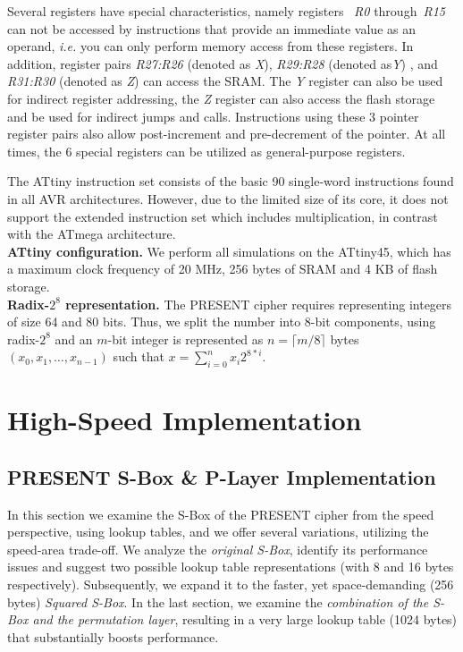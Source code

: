 \documentclass[11pt]{llncs2e} %
\begin{document}
Several registers have special characteristics, namely registers ~\textit{R0} through~\textit{R15} can not be accessed by instructions that provide an immediate value as an operand, \emph{i.e.} you can only perform memory access from these registers.
In addition, register pairs \textit{R27:R26} (denoted as \emph{X}), \textit{R29:R28} (denoted as\emph{Y}) , and \textit{R31:R30} (denoted as \emph{Z}) can access the SRAM.
The \emph{Y} register can also be used for indirect register addressing, the \emph{Z} register can also access the flash storage and be used for indirect jumps and calls.
Instructions using these 3 pointer register pairs also allow post-increment and pre-decrement of the pointer.
At all times, the 6 special registers can be utilized as general-purpose registers.

The ATtiny instruction set consists of the basic 90 single-word instructions found in all AVR architectures. However, due to the limited size of its core, it does not support the extended instruction set which includes multiplication, in contrast with the ATmega architecture.\\
\textbf{ATtiny configuration.} We perform all simulations on the ATtiny45, which has a maximum clock frequency of 20 MHz, 256 bytes of SRAM and 4 KB of flash storage.\\
\textbf{Radix-$2^8$ representation.} The PRESENT cipher requires representing integers of size 64 and 80 bits. Thus, we split the number into 8-bit components, using radix-$2^8$ and an $m$-bit integer is represented as $n=\lceil{m/8}\rceil$ bytes $(x_0,x_1,\dots,x_{n-1})$ such that $x=\sum_{i=0}^n{x_i 2^{8*i}}$.

\section{High-Speed Implementation}

\subsection{PRESENT S-Box \& P-Layer Implementation}\label{sbox}
In this section we examine the S-Box of the PRESENT cipher from the speed perspective, using lookup tables, and we offer several variations, utilizing the speed-area trade-off. We analyze the \emph{original S-Box}, identify its performance issues and suggest two possible lookup table representations (with 8 and 16 bytes respectively). Subsequently, we expand it to the faster, yet space-demanding (256 bytes) \emph{Squared S-Box}. In the last section, we examine the \emph{combination of the S-Box and the permutation layer}, resulting in a very large lookup table (1024 bytes) that substantially boosts performance.
\end{document}
